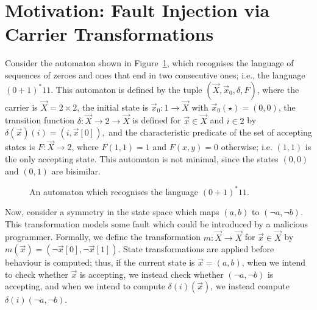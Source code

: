 \section{Motivation: Fault Injection via Carrier Transformations}

Consider the automaton shown in Figure~\ref{fig:ExampleLatent}, which recognises the language of sequences of zeroes and ones that end in two consecutive ones; i.e., the language $(0+1)^*11$. 
This automaton is defined by the tuple $(\vec{X},\vec{x}_0,\delta,F)$, where the carrier is $\vec{X}=2\times2$, the initial state is $\vec{x}_0\colon1\rightarrow \vec{X}$ with $\vec{x}_0(\star)=(0,0)$, the transition function $\delta\colon \vec{X}\rightarrow 2\rightarrow\vec{X}$ is defined for $\vec{x}\in \vec{X}$ and $i \in 2$ by $\delta(\vec{x})(i)=(i,\vec{x}[0]),$ and the characteristic predicate of the set of accepting states is $F\colon\vec{X}\rightarrow 2$, where $F(1,1)=1$ and $F(x,y)=0$ otherwise; i.e. $(1,1)$ is the only accepting state. This automaton is not minimal, since the states $(0,0)$ and $(0,1)$ are bisimilar.

\begin{figure}[t]
    \centering
    \caption{An automaton which recognises the language $(0+1)^*11$.}
    \label{fig:ExampleLatent}
\end{figure}

Now, %
consider a symmetry in the state space which maps $(a,b)$ to $(\lnot a, \lnot b)$. This transformation models some fault which could be introduced by a malicious programmer. Formally, %
we define the transformation $m\colon \vec{X}\rightarrow\vec{X}$ for $\vec{x}\in \vec{X}$ by $m(\vec{x})=(\lnot \vec{x}[0],\lnot \vec{x}[1])$. 
State transformations are applied before behaviour is computed; thus, if the current state is $\vec{x}=(a,b)$, when we intend to check whether $\vec{x}$ is accepting, we instead check whether $(\lnot a, \lnot b)$ is accepting, and when we intend to compute $\delta(i)(\vec{x})$, we instead compute $\delta(i)(\lnot a, \lnot b)$. 

